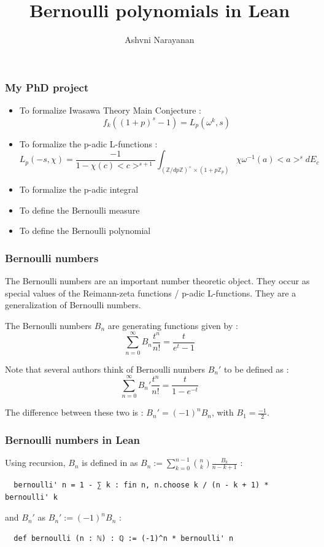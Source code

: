 \documentclass{beamer}
\title{Bernoulli polynomials in Lean}
\author{Ashvni Narayanan}
\institute{Lean Summer Projects 2021}
\begin{document}
\frame{\titlepage}

\begin{frame}
\frametitle{My PhD project}
\begin{itemize}
  \item To formalize Iwasawa Theory Main Conjecture : \\
     $$ f_k((1 + p)^s - 1) = L_p(\omega^k, s) $$ \pause
  \item To formalize the p-adic L-functions : \\
    $$ L_p(-s, \chi) = \frac{-1}{1 - \chi(c)<c>^{s + 1}}
    \int_{(\mathbb{Z}/dp\mathbb{Z})^{\times} \times (1 + p \mathbb{Z}_p)} \chi \omega^{-1}(a) <a>^s dE_c $$ \pause
  \item To formalize the p-adic integral \pause
  \item To define the Bernoulli measure \pause
  \item To define the Bernoulli polynomial
\end{itemize}
\end{frame}

\begin{frame}
\frametitle{Bernoulli numbers}
The Bernoulli numbers are an important number theoretic object. They occur as special values
of the Reimann-zeta functions / p-adic L-functions. They are a generalization of
Bernoulli numbers. \pause

The Bernoulli numbers $B_n$ are generating functions given by :
$$\sum_{n = 0}^{\infty} B_n\frac{t^n}{n!}=\frac{t}{e^{t} - 1}$$ \pause

Note that several authors think of Bernoulli numbers $B_n'$ to be defined as :
$$\sum_{n = 0}^{\infty} B_n'\frac{t^n}{n!}=\frac{t}{1-e^{-t}}$$ \pause

The difference between these two is : $B_n' = (-1)^n B_n$, with $B_1 = \frac{-1}{2}$. \pause
\end{frame}

\begin{frame}[fragile]
\frametitle{Bernoulli numbers in Lean}
Using recursion, $B_n$ is defined in  as
$B_n := \sum_{k = 0}^{n - 1} {n \choose k} \frac{B_k}{n - k + 1}$ :
\begin{lstlisting}
  bernoulli' n = 1 - ∑ k : fin n, n.choose k / (n - k + 1) * bernoulli' k
\end{lstlisting} \pause
and $B_n'$ as
$B_n' := (-1)^n B_n $ :
\begin{lstlisting}
  def bernoulli (n : ℕ) : ℚ := (-1)^n * bernoulli' n
\end{lstlisting}
\end{frame}
\end{document}
